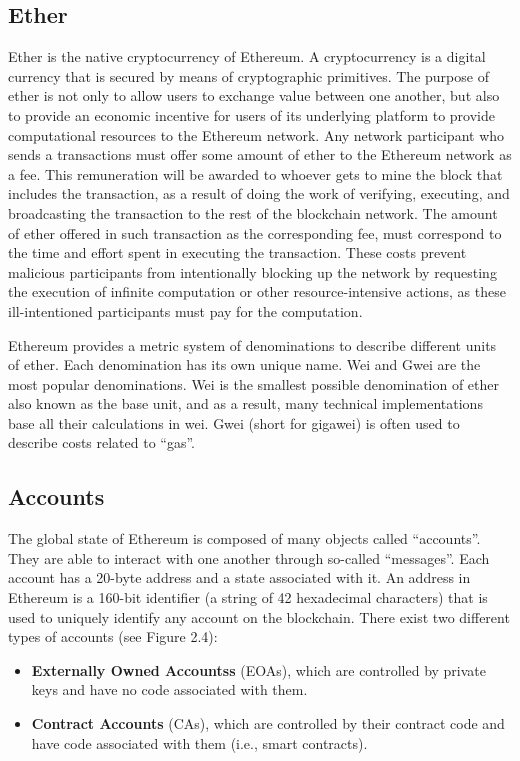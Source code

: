     \subsection{Ether}
        Ether is the native cryptocurrency of Ethereum.
        A cryptocurrency is a digital currency that is secured by means of cryptographic primitives.
        The purpose of ether is not only to allow users to exchange value between one another, but also to provide an economic incentive for users of its underlying platform to provide computational resources to the Ethereum network.
        Any network participant who sends a transactions must offer some amount of ether to the Ethereum network as a fee.
        This remuneration will be awarded to whoever gets to mine the block that includes the transaction, as a result of doing the work of verifying, executing, and broadcasting the transaction to the rest of the blockchain network.
        The amount of ether offered in such transaction as the corresponding fee, must correspond to the time and effort spent in executing the transaction.
        These costs prevent malicious participants from intentionally blocking up the network by requesting the execution of infinite computation or other resource-intensive actions, as these ill-intentioned participants must pay for the computation.

        Ethereum provides a metric system of denominations to describe different units of ether.
        Each denomination has its own unique name.
        Wei and Gwei are the most popular denominations.
        Wei is the smallest possible denomination of ether also known as the base unit, and as a result, many technical implementations base all their calculations in wei.
        Gwei (short for gigawei) is often used to describe costs related to “gas”.

    \subsection{Accounts}
        The global state of Ethereum is composed of many objects called “accounts”.
        They are able to interact with one another through so-called “messages”.
        Each account has a 20-byte address and a state associated with it.
        An address in Ethereum is a 160-bit identifier (a string of 42 hexadecimal characters) that is used to uniquely identify any account on the blockchain.
        There exist two different types of accounts (see Figure 2.4):
        
        \begin{itemize}
            \item \textbf{Externally Owned Accountss} (EOAs), which are controlled by private keys and have no code associated with them.
            \item \textbf{Contract Accounts} (CAs), which are controlled by their contract code and have code associated with them (i.e., smart contracts).
        \end{itemize}

